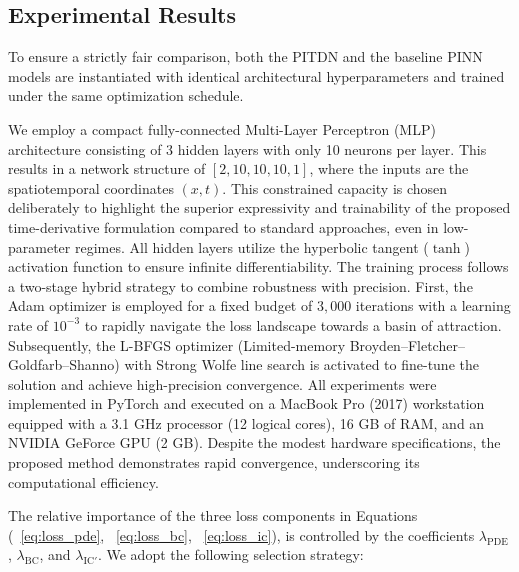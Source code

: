 \documentclass[11pt,reqno]{amsart}
\theoremstyle{plain}
\theoremstyle{definition}
\theoremstyle{remark}
\begin{document}
\subsection{Experimental Results}\label{sec:experiments}
To ensure a strictly fair comparison, both the PITDN and the baseline PINN models are instantiated with identical architectural hyperparameters and trained under the same optimization schedule.

We employ a compact fully-connected Multi-Layer Perceptron (MLP) architecture consisting of 3 hidden layers with only 10 neurons per layer. This results in a network structure of $[2, 10, 10, 10, 1]$, where the inputs are the spatiotemporal coordinates $(x,t)$. This constrained capacity is chosen deliberately to highlight the superior expressivity and trainability of the proposed time-derivative formulation compared to standard approaches, even in low-parameter regimes. All hidden layers utilize the hyperbolic tangent ($\tanh$) activation function to ensure infinite differentiability. The training process follows a two-stage hybrid strategy to combine robustness with precision. First, the Adam optimizer is employed for a fixed budget of $3,000$ iterations with a learning rate of $10^{-3}$ to rapidly navigate the loss landscape towards a basin of attraction. Subsequently, the L-BFGS optimizer (Limited-memory Broyden–Fletcher–Goldfarb–Shanno) with Strong Wolfe line search is activated to fine-tune the solution and achieve high-precision convergence. All experiments were implemented in PyTorch and executed on a MacBook Pro (2017) workstation equipped with a 3.1 GHz processor (12 logical cores), 16 GB of RAM, and an NVIDIA GeForce GPU (2 GB). Despite the modest hardware specifications, the proposed method demonstrates rapid convergence, underscoring its computational efficiency.

The relative importance of the three loss components in Equations (~\ref{eq:loss_pde}, ~\ref{eq:loss_bc}, ~\ref{eq:loss_ic}), is controlled by the coefficients $\lambda_{\text{PDE}}$, $\lambda_{\text{BC}}$,  and $\lambda_{\text{IC}'}$. We adopt the following selection strategy:
\end{document}
